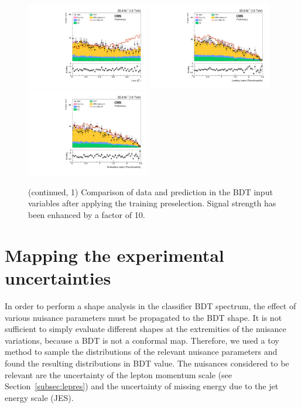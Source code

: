 \begin{figure}[htbp]
\begin{center}
\includegraphics[width=0.48\textwidth]{figures/mva_abs_cos_theta_CS_l1_nice.pdf}
\includegraphics[width=0.48\textwidth]{figures/mva_abs_etal1_nice.pdf}
\includegraphics[width=0.48\textwidth]{figures/mva_abs_etal2_nice.pdf}
\caption{(continued, 1) Comparison of data and prediction in the BDT input variables after applying the training preselection. Signal strength has been enhanced by a factor of 10.}
\label{fig:bdt_inputvar_histos2}
\end{center}
\end{figure}


\section{Mapping the experimental uncertainties}
\label{sec:bdt_toys}
In order to perform a shape analysis in the classifier BDT spectrum, the effect of various nuisance parameters must be propagated to the BDT shape.
It is not sufficient to simply evaluate different shapes at the extremities of the nuisance variations, because a BDT is not a conformal map.
Therefore, we used a toy method to sample the distributions of the relevant nuisance parameters and found the resulting distributions in BDT value.
The nuisances considered to be relevant are the uncertainty of the lepton momentum scale (see Section~\ref{subsec:lepres}) and the uncertainty of missing energy due to the jet energy scale (JES).

